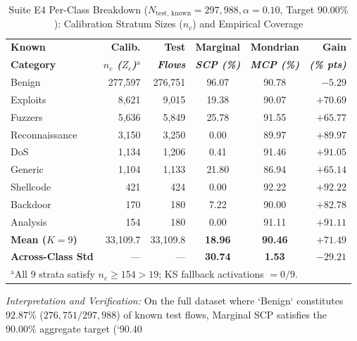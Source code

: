﻿\documentclass[conference]{IEEEtran}
\begin{document}
\begin{table}[t]
\caption{Suite E4 Per-Class Breakdown ($N_{\text{test, known}} = 297,988, \alpha = 0.10$, Target $90.00\%$): Calibration Stratum Sizes ($n_c$) and Empirical Coverage}
\begin{center}
\begin{tabular}{|l|r|r|c|c|r|}
\hline
\textbf{Known} & \textbf{Calib.} & \textbf{Test} & \textbf{Marginal} & \textbf{Mondrian} & \textbf{Gain} \\
\textbf{Category} & \textbf{\textit{$n_c$ ($Z_c$)$^{\mathrm{a}}$}} & \textbf{\textit{Flows}} & \textbf{\textit{SCP (\%)}} & \textbf{\textit{MCP (\%)}} & \textbf{\textit{(\% pts)}} \\
\hline
Benign & 277,597 & 276,751 & 96.07 & 90.78 & $-5.29$ \\
Exploits & 8,621 & 9,015 & 19.38 & 90.07 & $+70.69$ \\
Fuzzers & 5,636 & 5,849 & 25.78 & 91.55 & $+65.77$ \\
Reconnaissance & 3,150 & 3,250 & 0.00 & 89.97 & $+89.97$ \\
DoS & 1,134 & 1,206 & 0.41 & 91.46 & $+91.05$ \\
Generic & 1,104 & 1,133 & 21.80 & 86.94 & $+65.14$ \\
Shellcode & 421 & 424 & 0.00 & 92.22 & $+92.22$ \\
Backdoor & 170 & 180 & 7.22 & 90.00 & $+82.78$ \\
Analysis & 154 & 180 & 0.00 & 91.11 & $+91.11$ \\
\hline
\textbf{Mean ($K=9$)} & 33,109.7 & 33,109.8 & \textbf{18.96} & \textbf{90.46} & \textbf{$+71.49$} \\
\textbf{Across-Class Std} & --- & --- & \textbf{30.74} & \textbf{1.53} & \textbf{$-29.21$} \\
\hline
\multicolumn{6}{l}{$^{\mathrm{a}}$All 9 strata satisfy $n_c \ge 154 > 19$; KS fallback activations $= 0 / 9$.}
\end{tabular}
\label{tab:e4_per_class}
\end{center}
\end{table}

\textit{Interpretation and Verification:} On the full dataset where `Benign` constitutes $92.87\%$ ($276,751 / 297,988$) of known test flows, Marginal SCP satisfies the $90.00\%$ aggregate target (`90.40%
\end{document}
